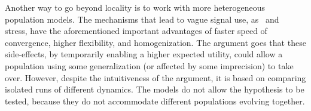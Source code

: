 \documentclass[a4paper]{article}
\begin{document}
Another way to go beyond locality is to work with more heterogeneous population models.
The mechanisms that lead to vague signal use, as~\textcite{oconnor_evolution_2014} and~\textcite{franke_vagueness_2017} stress, have the aforementioned important advantages of faster speed of convergence, higher flexibility, and homogenization.
The argument goes that these side-effects, by temporarily enabling a higher expected utility, could allow a population using some generalization (or affected by some imprecision) to take over.
However, despite the intuitiveness of the argument, it is based on comparing isolated runs of different dynamics.
The models do not allow the hypothesis to be tested, because they do not accommodate different populations evolving together.
%
\end{document}
